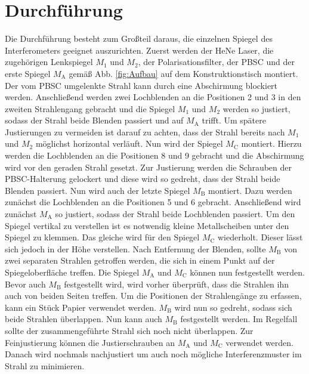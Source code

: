 
\section{Durchführung}
\label{sec:Durchführung}
Die Durchführung besteht zum Großteil daraus, die einzelnen Spiegel des Interferometers geeignet auszurichten. %
Zuerst werden der HeNe Laser, die zugehörigen Lenkspiegel $M_\text{1}$ und $M_\text{2}$, der Polarisationsfilter, der PBSC und der erste Spiegel $M_\text{A}$ gemäß Abb. \ref{fig:Aufbau} auf dem Konstruktionstisch montiert. Der vom PBSC umgelenkte Strahl kann durch eine Abschirmung blockiert werden. Anschließend werden zwei Lochblenden an die Positionen 2 und 3 in den zweiten Strahlengang gebracht und die Spiegel $M_\text{1}$ und $M_\text{2}$ werden so justiert, sodass der Strahl beide Blenden passiert und auf $M_\text{A}$ trifft. Um spätere Justierungen zu vermeiden ist darauf zu achten, dass der Strahl bereits nach $M_\text{1}$ und $M_\text{2}$ möglichst horizontal verläuft.  Nun wird der Spiegel $M_\text{C}$ montiert. Hierzu werden die Lochblenden an die Positionen 8 und 9 gebracht und die Abschirmung wird vor den geraden Strahl gesetzt. 
Zur Justierung werden die Schrauben der PBSC-Halterung gelockert und diese wird so gedreht, dass der Strahl beide Blenden passiert. Nun wird auch der letzte Spiegel $M_\text{B}$ montiert. Dazu werden zunächst die Lochblenden an die Positionen 5 und 6 gebracht. Anschließend wird zunächst $M_\text{A}$ so justiert, sodass der Strahl beide Lochblenden passiert. Um den Spiegel vertikal zu verstellen ist es notwendig kleine Metallscheiben unter den Spiegel zu klemmen. Das gleiche wird für den Spiegel $M_\text{C}$ wiederholt. Dieser lässt sich jedoch in der Höhe verstellen. Nach Entfernung der Blenden, sollte $M_\text{B}$ von zwei separaten Strahlen getroffen werden, die sich in einem Punkt auf der Spiegeloberfläche treffen.
Die Spiegel $M_\text{A}$ und $M_\text{C}$ können nun festgestellt werden. Bevor auch $M_\text{B}$ festgestellt wird, wird vorher überprüft, dass die Strahlen ihn auch von beiden Seiten treffen. Um die Positionen der Strahlengänge zu erfassen, kann ein Stück Papier verwendet werden. $M_\text{B}$ wird nun so gedreht, sodass sich beide Strahlen überlappen. Nun kann auch $M_\text{B}$ festgestellt werden.
Im Regelfall sollte der zusammengeführte Strahl sich noch nicht überlappen. Zur Feinjustierung können die Justierschrauben an $M_\text{A}$ und $M_\text{C}$ verwendet werden. Danach wird nochmals nachjustiert um auch noch mögliche Interferenzmuster im Strahl zu minimieren.
